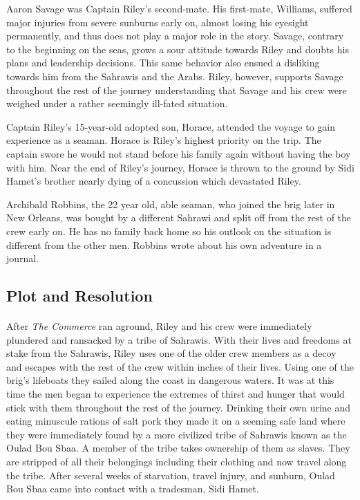 Aaron Savage was Captain Riley's second-mate. His first-mate, Williams, suffered major injuries from severe sunburns early on, almost losing his eyesight permanently, and thus does not play a major role in the story. Savage, contrary to the beginning on the seas, grows a sour attitude towards Riley and doubts his plans and leadership decisions. This same behavior also ensued a disliking towards him from the Sahrawis and the Arabs. Riley, however, supports Savage throughout the rest of the journey understanding that Savage and his crew were weighed under a rather seemingly ill-fated situation.

Captain Riley's 15-year-old adopted son, Horace, attended the voyage to gain experience as a seaman. Horace is Riley's highest priority on the trip. The captain swore he would not stand before his family again without having the boy with him. Near the end of Riley's journey, Horace is thrown to the ground by Sidi Hamet's brother nearly dying of a concussion which devastated Riley. 

Archibald Robbins, the 22 year old, able seaman, who joined the brig later in New Orleans, was bought by a different Sahrawi and split off from the rest of the crew early on. He has no family back home so his outlook on the situation is different from the other men. Robbins wrote about his own adventure in a journal. 

\subsection*{Plot and Resolution} \paragraph{}
After \textit{The Commerce} ran aground, Riley and his crew were immediately plundered and ransacked by a tribe of Sahrawis. With their lives and freedoms at stake from the Sahrawis, Riley uses one of the older crew members as a decoy and escapes with the rest of the crew within inches of their lives. Using one of the brig's lifeboats they sailed along the coast in dangerous waters. It was at this time the men began to experience the extremes of thirst and hunger that would stick with them throughout the rest of the journey. Drinking their own urine and eating minuscule rations of salt pork they made it on a seeming safe land where they were immediately found by a more civilized tribe of Sahrawis known as the Oulad Bou Sbaa. A member of the tribe takes ownership of them as slaves. They are stripped of all their belongings including their clothing and now travel along the tribe. After several weeks of starvation, travel injury, and sunburn, Oulad Bou Sbaa came into contact with a tradesman, Sidi Hamet.

